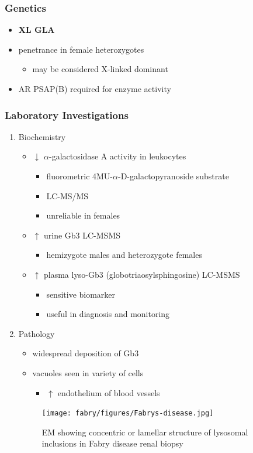 \documentclass[12pt]{scrartcl}
\begin{document}
\subsubsection{Genetics}
\label{sec:org952b93b}
\begin{itemize}
\item \textbf{XL GLA}
\item penetrance in female heterozygotes
\begin{itemize}
\item may be considered X-linked dominant
\end{itemize}
\item AR PSAP(B) required for enzyme activity
\end{itemize}
\subsubsection{Laboratory Investigations}
\label{sec:orgbab3727}
\begin{enumerate}
\item Biochemistry
\label{sec:org6ad0be8}
\begin{itemize}
\item \(\downarrow\) \(\alpha\)-galactosidase A activity in leukocytes
\begin{itemize}
\item fluorometric 4MU-\(\alpha\)-D-galactopyranoside substrate
\item LC-MS/MS
\item unreliable in females
\end{itemize}
\item \(\uparrow\) urine Gb3 LC-MSMS 
\begin{itemize}
\item hemizygote males and heterozygote females
\end{itemize}
\item \(\uparrow\) plasma lyso-Gb3 (globotriaosylsphingosine) LC-MSMS
\begin{itemize}
\item sensitive biomarker
\item useful in diagnosis and monitoring
\end{itemize}
\end{itemize}

\item Pathology
\label{sec:org1be88d5}
\begin{itemize}
\item widespread deposition of Gb3
\item vacuoles seen in variety of cells
\begin{itemize}
\item \(\uparrow\) endothelium of blood vessels
\end{itemize}
\end{itemize}

\begin{figure}[htbp]
\centering
\texttt{[image: fabry/figures/Fabrys-disease.jpg]}
\caption[Fabry EM]{\label{fig:org622a491}EM showing concentric or lamellar structure of lysosomal inclusions in Fabry disease renal biopsy}
\end{figure}
\end{enumerate}
\end{document}
